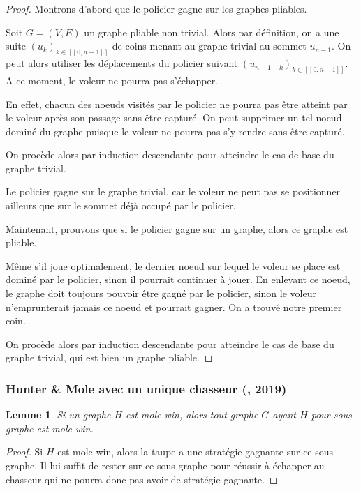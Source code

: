 \documentclass[12pt]{article}
\newtheorem{lemme}[theoreme]{Lemme}
\newcommand{\inN}[2]{\in[\![#1,#2]\!]}
\newcommand{\hm}{Hunter \& Mole\xspace}
\begin{document}
\begin{proof}
\boxed{\Leftarrow} Montrons d'abord que le policier gagne sur les graphes pliables.

Soit $G = (V,E)$ un graphe pliable non trivial. Alors par définition, on a une suite $(u_k)_{k\inN{0}{n-1}}$ de coins menant au graphe trivial au sommet $u_{n-1}$. On peut alors utiliser les déplacements du policier suivant $(u_{n-1-k})_{k\inN{0}{n-1}}$. A ce moment, le voleur ne pourra pas s'échapper.

En effet, chacun des noeuds visités par le policier ne pourra pas être atteint par le voleur après son passage sans être capturé. On peut supprimer un tel noeud dominé du graphe puisque le voleur ne pourra pas s'y rendre sans être capturé. 

On procède alors par induction descendante pour atteindre le cas de base du graphe trivial.

Le policier gagne sur le graphe trivial, car le voleur ne peut pas se positionner ailleurs que sur le sommet déjà occupé par le policier.

\boxed{\Rightarrow} Maintenant, prouvons que si le policier gagne sur un graphe, alors ce graphe est pliable.

Même s'il joue optimalement, le dernier noeud sur lequel le voleur se place est dominé par le policier, sinon il pourrait continuer à jouer. En enlevant ce noeud, le graphe doit toujours pouvoir être gagné par le policier, sinon le voleur n'emprunterait jamais ce noeud et pourrait gagner. On a trouvé notre premier coin.

On procède alors par induction descendante pour atteindre le cas de base du graphe trivial, qui est bien un graphe pliable.
\end{proof}

\subsubsection{\hm avec un unique chasseur (\cite{komarov2013hunter}, 2019)}

\begin{lemme}\label{thm:sous-graphe}
    Si un graphe $H$ est mole-win, alors tout graphe $G$ ayant $H$ pour sous-graphe est mole-win.
\end{lemme}

\begin{proof}
Si $H$ est mole-win, alors la taupe a une stratégie gagnante sur ce sous-graphe. Il lui suffit de rester sur ce sous graphe pour réussir à échapper au chasseur qui ne pourra donc pas avoir de stratégie gagnante.
\end{proof}
\end{document}
